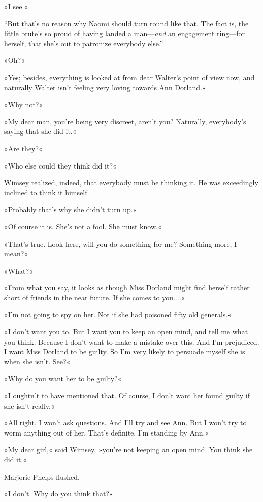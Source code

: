 »I see.«

\enquote{But that's no reason why Naomi should turn round like that. The fact is, the little brute's so proud of having landed a man---\textit{and} an engagement ring\allowbreak---\allowbreak for herself, that she's out to patronize everybody else.}

»Oh?«

»Yes; besides, everything is looked at from dear Walter's point of view now, and naturally Walter isn't feeling very loving towards Ann Dorland.«

»Why not?«

»My dear man, you're being very discreet, aren't you? Naturally, everybody's saying that she did it.«

»Are they?«

»Who else could they think did it?«

Wimsey realized, indeed, that everybody must be thinking it. He was exceedingly inclined to think it himself.

»Probably that's why she didn't turn up.«

»Of course it is. She's not a fool. She must know.«

»That's true. Look here, will you do something for me? Something more, I mean?«

»What?«

»From what you say, it looks as though Miss Dorland might find herself rather short of friends in the near future. If she comes to you....«

»I'm not going to spy on her. Not if she had poisoned fifty old generals.«

»I don't want you to. But I want you to keep an open mind, and tell me what you think. Because I don't want to make a mistake over this. And I'm prejudiced. I want Miss Dorland to be guilty. So I'm very likely to persuade myself she is when she isn't. See?«

»Why do you want her to be guilty?«

»I oughtn't to have mentioned that. Of course, I don't want her found guilty if she isn't really.«

»All right. I won't ask questions. And I'll try and see Ann. But I won't try to worm anything out of her. That's definite. I'm standing by Ann.«

»My dear girl,« said Wimsey, »you're not keeping an open mind. You think she did it.«

Marjorie Phelps flushed.

»I don't. Why do you think that?«

